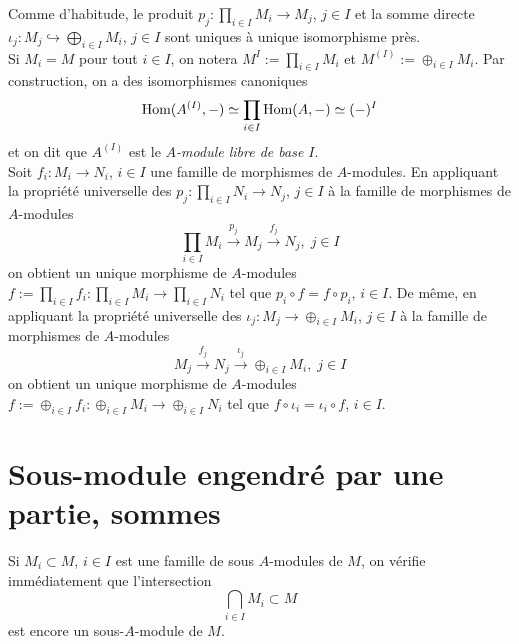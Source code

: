 \documentclass[a4paper, oneside, 12pt]{book}
\theoremstyle{definition} %
\begin{document}
  Comme d'habitude, le produit $p_{j}:\prod_{i\in I}M_{i}\rightarrow M_{j}$, $j\in I$ et la somme directe $\iota_{j}:M_{j}\hookrightarrow \bigoplus_{i\in I}M_{i}$, $j\in I$ sont uniques à unique isomorphisme près. \\

 


 Si $M_{i}=M$ pour tout $i\in I$, on notera $M^{I}:=\prod_{i\in I}M_{i}$ et $M^{(I)}:=\oplus_{i\in I}M_{i}$. Par construction, on a des isomorphismes   canoniques
$$ \hbox{\rm Hom}(A^{(I)},-)\simeq \prod_{i\in I}\hbox{\rm Hom}(A,-)\simeq (-)^{I}$$
et on dit que $A^{(I)}$ est le \textit{$A$-module libre de base $I$}.\\


 Soit $f_i:M_i\rightarrow N_i$, $i\in I$ une famille de morphismes de $A$-modules. En appliquant la propriété universelle des $p_j:\prod_{i\in I}N_i\rightarrow N_j$, $j\in I$ à la famille de morphismes de $A$-modules 
$$ \prod_{i\in I}M_i\stackrel{p_j}{\rightarrow}M_j\stackrel{f_j}{\rightarrow} N_j,\; j\in I$$
on obtient un unique morphisme de $A$-modules $f:=\prod_{i\in I}f_i:\prod_{i\in I}M_i\rightarrow \prod_{i\in I}N_i$ tel que $p_i\circ f=f\circ p_i$, $i\in I$.   De même,  en appliquant la propriété universelle des $\iota_j:M_j\rightarrow \oplus_{i\in I}M_i$, $j\in I$ à la famille de morphismes de $A$-modules 
$$ M_j\stackrel{f_j}{\rightarrow}N_j\stackrel{\iota_j}{\rightarrow} \oplus_{i\in I}M_i,\; j\in I$$
on obtient un unique morphisme de $A$-modules $f:=\oplus_{i\in I}f_i:\oplus_{i\in I}M_i\rightarrow \oplus_{i\in I}N_i$ tel que $  f\circ \iota_i=  \iota_i\circ f$, $i\in I$.  

\section{Sous-module engendré par une partie, sommes}  Si $M_{i}\subset M$, $i\in I$ est une famille de sous $A$-modules de $M$, on vérifie immédiatement que l'intersection $$\bigcap_{i\in I}M_{i}\subset M$$ est encore un sous-$A$-module de $M$.\\
\end{document}
